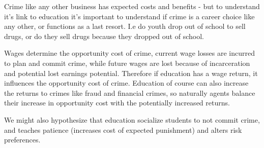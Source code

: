\documentclass[12pt, a4paper]{article}
\begin{document}
\begin{multicols}{2}
Crime like any other business has expected costs and benefits - but to understand it's link to education it's important to understand if crime is a career choice like any other, or functions as a last resort. I.e do youth drop out of school to sell drugs, or do they sell drugs because they dropped out of school.

Wages determine the opportunity cost of crime, current wage losses are incurred to plan and commit crime, while future wages are lost because of incarceration and potential lost earnings potential. Therefore if education has a wage return, it influences the opportunity cost of crime. Education of course can also increase the returns to crimes like fraud and financial crimes, so naturally agents balance their increase in opportunity cost with the potentially increased returns.

We might also hypothesize that education socialize students to not commit crime, and teaches patience (increases cost of expected punishment) and alters risk preferences.


\end{multicols}
\end{document}
